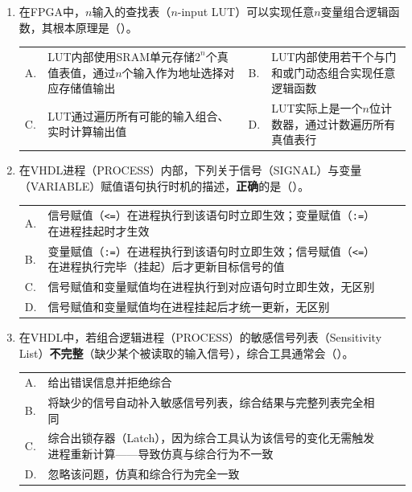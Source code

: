 \begin{enumerate}[label=\arabic*.]

\item 在FPGA中，$n$输入的查找表（$n$-input LUT）可以实现任意$n$变量组合逻辑函数，其根本原理是（\quad）。

\vspace{0.3cm}

\begin{tabular}{@{}lp{}@{\qquad}lp{}@{}}
A. & LUT内部使用SRAM单元存储$2^n$个真值表值，通过$n$个输入作为地址选择对应存储值输出 &
B. & LUT内部使用若干个与门和或门动态组合实现任意逻辑函数 \\
C. & LUT通过遍历所有可能的输入组合、实时计算输出值 &
D. & LUT实际上是一个$n$位计数器，通过计数遍历所有真值表行 \\
\end{tabular}

\vspace{0.8cm}

\item 在VHDL进程（PROCESS）内部，下列关于信号（SIGNAL）与变量（VARIABLE）赋值语句执行时机的描述，\textbf{正确}的是（\quad）。

\vspace{0.3cm}

\begin{tabular}{@{}lp{}@{\qquad}lp{}@{}}
A. & 信号赋值（\verb|<=|）在进程执行到该语句时立即生效；变量赋值（\verb|:=|）在进程挂起时才生效 \\
B. & 变量赋值（\verb|:=|）在进程执行到该语句时立即生效；信号赋值（\verb|<=|）在进程执行完毕（挂起）后才更新目标信号的值 \\
C. & 信号赋值和变量赋值均在进程执行到对应语句时立即生效，无区别 \\
D. & 信号赋值和变量赋值均在进程挂起后才统一更新，无区别 \\
\end{tabular}

\vspace{0.8cm}

\item 在VHDL中，若组合逻辑进程（PROCESS）的敏感信号列表（Sensitivity List）\textbf{不完整}（缺少某个被读取的输入信号），综合工具通常会（\quad）。

\vspace{0.3cm}

\begin{tabular}{@{}lp{}@{\qquad}lp{}@{}}
A. & 给出错误信息并拒绝综合 \\
B. & 将缺少的信号自动补入敏感信号列表，综合结果与完整列表完全相同 \\
C. & 综合出锁存器（Latch），因为综合工具认为该信号的变化无需触发进程重新计算——导致仿真与综合行为不一致 \\
D. & 忽略该问题，仿真和综合行为完全一致 \\
\end{tabular}


\end{enumerate}
